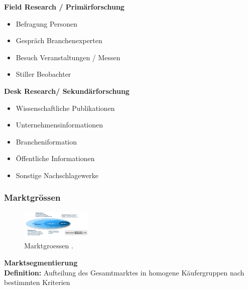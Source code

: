 \documentclass[../ZF_Wing.tex]{subfiles}
\begin{document}
\begin{multicols}{2}

\textbf{Field Research / Primärforschung}
\begin{itemize}
	\item Befragung Personen
	\item Gespräch Branchenexperten
	\item Besuch Veranstaltungen / Messen
	\item Stiller Beobachter
\end{itemize}

\columnbreak
\textbf{Desk Research/ Sekundärforschung}
\begin{itemize}
	\item Wissenschaftliche Publikationen
	\item Unternehmensinformationen
	\item Brancheniformation
	\item Öffentliche Informationen
	\item Sonstige Nachschlagewerke
\end{itemize}


\end{multicols}


\subsubsection{Marktgrössen}
\begin{figure}[H]
\centering
\includegraphics[width=0.3\textwidth]{Resources/Image/Marktgroessen.png}
\caption{\label{fig:BegriffMarketing}Marktgroessen .}
\end{figure}

\textbf{Marktsegmentierung}\\

\textbf{Definition: } Aufteilung des Gesamtmarktes in homogene Käufergruppen nach bestimmten Kriterien
\end{document}
